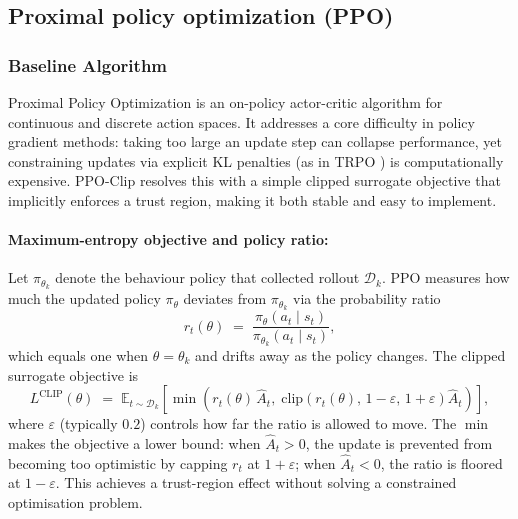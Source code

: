 \documentclass{article}
\begin{document}
\subsection{Proximal policy optimization (PPO)}
\subsubsection{Baseline Algorithm}
Proximal Policy Optimization \citep{schulman2017proximal} is an on-policy actor-critic algorithm for continuous and discrete action spaces. It addresses a core difficulty in policy gradient methods: taking too large an update step can collapse performance, yet constraining updates via explicit KL penalties (as in TRPO \citep{....}) is computationally expensive. PPO-Clip resolves this with a simple clipped surrogate objective that implicitly enforces a trust region, making it both stable and easy to implement.

\paragraph{Maximum-entropy objective and policy ratio:} Let $\pi_{\theta_k}$ denote the behaviour policy that collected rollout $\mathcal{D}_k$. PPO measures how much the updated policy $\pi_\theta$ deviates from $\pi_{\theta_k}$ via the probability ratio
\begin{equation}
    r_t(\theta) \;=\; \frac{\pi_\theta(a_t \mid s_t)}{\pi_{\theta_k}(a_t \mid s_t)},
\end{equation}
which equals one when $\theta = \theta_k$ and drifts away as the policy changes. The clipped surrogate objective is
\begin{equation}
    L^{\mathrm{CLIP}}(\theta)
    \;=\; \mathbb{E}_{t \sim \mathcal{D}_k}
    \!\left[
        \min\!\left(
            r_t(\theta)\,\hat{A}_t,\;
            \mathrm{clip}\!\left(r_t(\theta),\,1-\varepsilon,\,1+\varepsilon\right)\hat{A}_t
        \right)
    \right],
    \label{eq:ppo-clip}
\end{equation}
where $\varepsilon$ (typically $0.2$) controls how far the ratio is allowed to move. The $\min$ makes the objective a lower bound: when $\hat{A}_t > 0$, the update is prevented from becoming too optimistic by capping $r_t$ at $1+\varepsilon$; when $\hat{A}_t < 0$, the ratio is floored at $1-\varepsilon$. This achieves a trust-region effect without solving a constrained optimisation problem.
\end{document}
